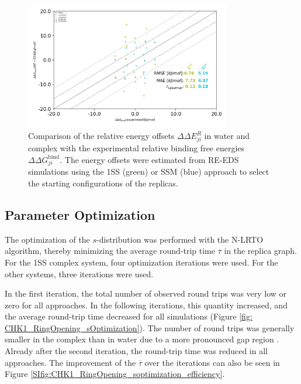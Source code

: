 \begin{figure}[H]
\centering
  \includegraphics[width=0.8\textwidth]{fig/results/ringOpening/paramOptimization/RingClosure_system_Eoff_final_results.png}
\caption{Comparison of the relative energy offsets $\Delta \Delta E^R_{ji}$ in water and complex with the experimental relative binding free energies $\Delta \Delta G^\text{bind}_{ji}$. The energy offsets were estimated from RE-EDS simulations using the 1SS (green) or SSM (blue) approach to select the starting configurations of the replicas.} \label{SIfig:Eoff_experiment_corr_RingOpening}
\end{figure}

\FloatBarrier

\subsection{Parameter Optimization}
The optimization of the $s$-distribution was performed with the N-LRTO \cite{Sidler2017} algorithm, thereby minimizing the average round-trip time $\overline{\tau}$ in the replica graph. For the 1SS complex system, four optimization iterations were used. For the other systems, three iterations were used. 

In the first iteration, the total number of observed round trips was very low or zero for all approaches. In the following iterations, this quantity increased, and the average round-trip time decreased for all simulations (Figure \ref{fig: CHK1_RingOpening_sOptimization}). The number of round trips was generally smaller in the complex than in water due to a more pronounced gap region \cite{Sidler2017}.
Already after the second iteration, the round-trip time was reduced in all approaches. The improvement of the $\overline{\tau}$ over the iterations can also be seen in Figure \ref{SIfig:CHK1_RingOpening_soptimization_efficiency}.

